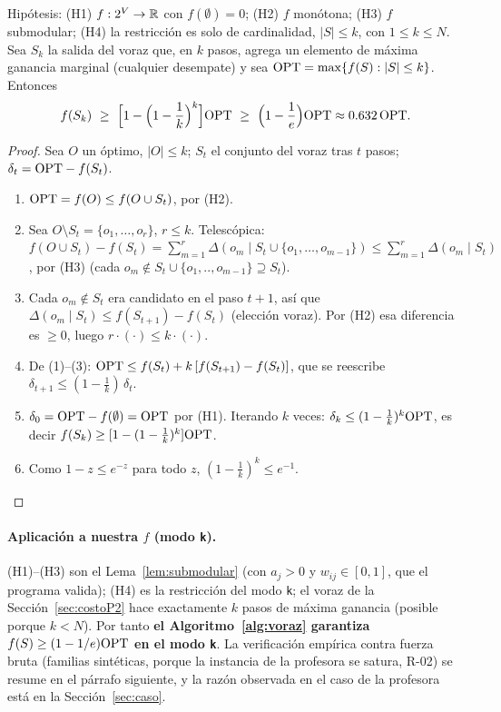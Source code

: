 \begin{teorema}\label{teo:nwf}
Hipótesis: (H1) $f:2^V\to\mathbb{R}$ con $f(\emptyset)=0$; (H2) $f$ monótona; (H3) $f$ submodular; (H4) la restricción es solo de cardinalidad, $|S|\le k$, con $1\le k\le N$. Sea $S_k$ la salida del voraz que, en $k$ pasos, agrega un elemento de máxima ganancia marginal (cualquier desempate) y sea $\mathrm{OPT}=\max\{f(S):|S|\le k\}$. Entonces
\[
f(S_k)\ \ge\ \Bigl[1-\Bigl(1-\frac1k\Bigr)^{k}\Bigr]\OPT\ \ge\ \Bigl(1-\frac1e\Bigr)\OPT\approx0.632\,\OPT.
\]
\end{teorema}
\begin{proof}
Sea $O$ un óptimo, $|O|\le k$; $S_t$ el conjunto del voraz tras $t$ pasos; $\delta_t=\mathrm{OPT}-f(S_t)$.
\begin{enumerate}[label=(\arabic*)]
\item $\mathrm{OPT}=f(O)\le f(O\cup S_t)$, por (H2).
\item Sea $O\setminus S_t=\{o_1,\dots,o_r\}$, $r\le k$. Telescópica: $f(O\cup S_t)-f(S_t)=\sum_{m=1}^{r}\Delta(o_m\mid S_t\cup\{o_1,\dots,o_{m-1}\})\le\sum_{m=1}^{r}\Delta(o_m\mid S_t)$, por (H3) (cada $o_m\notin S_t\cup\{o_1,..,o_{m-1}\}\supseteq S_t$).
\item Cada $o_m\notin S_t$ era candidato en el paso $t+1$, así que $\Delta(o_m\mid S_t)\le f(S_{t+1})-f(S_t)$ (elección voraz). Por (H2) esa diferencia es $\ge0$, luego $r\cdot(\cdot)\le k\cdot(\cdot)$.
\item De (1)–(3): $\mathrm{OPT}\le f(S_t)+k\,[f(S_{t+1})-f(S_t)]$, que se reescribe $\delta_{t+1}\le(1-\frac1k)\,\delta_t$.
\item $\delta_0=\mathrm{OPT}-f(\emptyset)=\mathrm{OPT}$ por (H1). Iterando $k$ veces: $\delta_k\le(1-\frac1k)^k\mathrm{OPT}$, es decir $f(S_k)\ge[1-(1-\frac1k)^k]\mathrm{OPT}$.
\item Como $1-z\le e^{-z}$ para todo $z$, $(1-\frac1k)^k\le e^{-1}$.
\end{enumerate}
\end{proof}

\paragraph{Aplicación a nuestra $f$ (modo \texttt{k}).} (H1)–(H3) son el Lema~\ref{lem:submodular} (con $a_j>0$ y $w_{ij}\in[0,1]$, que el programa valida); (H4) es la restricción del modo \texttt{k}; el voraz de la Sección~\ref{sec:costoP2} hace exactamente $k$ pasos de máxima ganancia (posible porque $k<N$). Por tanto \textbf{el Algoritmo~\ref{alg:voraz} garantiza $f(S)\ge(1-1/e)\mathrm{OPT}$ en el modo \texttt{k}}. La verificación empírica contra fuerza bruta (familias sintéticas, porque la instancia de la profesora se satura, R-02) se resume en el párrafo siguiente, y la razón observada en el caso de la profesora está en la Sección~\ref{sec:caso}.

